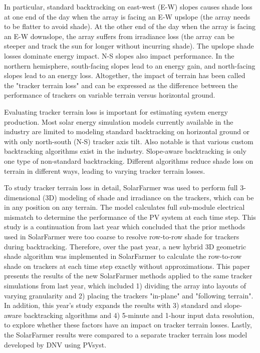 \documentclass[conference]{IEEEtran}
\begin{document}
In particular, standard backtracking on east-west (E-W) slopes causes shade loss at one end of the day when the array is facing an E-W upslope (the array needs to be flatter to avoid shade). At the other end of the day when the array is facing an E-W downslope, the array suffers from irradiance loss (the array can be steeper and track the sun for longer without incurring shade). The upslope shade losses dominate energy impact. N-S slopes also impact performance. In the northern hemisphere, south-facing slopes lead to an energy gain, and north-facing slopes lead to an energy loss. Altogether, the impact of terrain has been called the "tracker terrain loss" and can be expressed as the difference between the performance of trackers on variable terrain versus horizontal ground. 

Evaluating tracker terrain loss is important for estimating system energy production. Most solar energy simulation models currently available in the industry are limited to modeling standard backtracking on horizontal ground or with only north-south (N-S) tracker axis tilt. Also notable is that various custom backtracking algorithms exist in the industry. Slope-aware backtracking is only one type of non-standard backtracking. Different algorithms reduce shade loss on terrain in different ways, leading to varying tracker terrain losses. 

To study tracker terrain loss in detail, SolarFarmer \cite{Mikofski_8547323} was used to perform full 3-dimensional (3D) modeling of shade and irradiance on the trackers, which can be in any position on any terrain. The model calculates full sub-module electrical mismatch to determine the performance of the PV system at each time step. This study is a continuation from last year \cite{Mikofski_9300381} which concluded that the prior methods used in SolarFarmer were too coarse to resolve row-to-row shade for trackers during backtracking. Therefore, over the past year, a new hybrid 3D geometric shade algorithm was implemented in SolarFarmer to calculate the row-to-row shade on trackers at each time step exactly without approximations. This paper presents the results of the new SolarFarmer methods applied to the same tracker simulations from last year, which included 1) dividing the array into layouts of varying granularity and 2) placing the trackers "in-plane" and "following terrain". In addition, this year's study expands the results with 3) standard and slope-aware backtracking algorithms and 4) 5-minute and 1-hour input data resolution, to explore whether these factors have an impact on tracker terrain losses. Lastly, the SolarFarmer results were compared to a separate tracker terrain loss model developed by DNV using PVsyst. 
\end{document}
